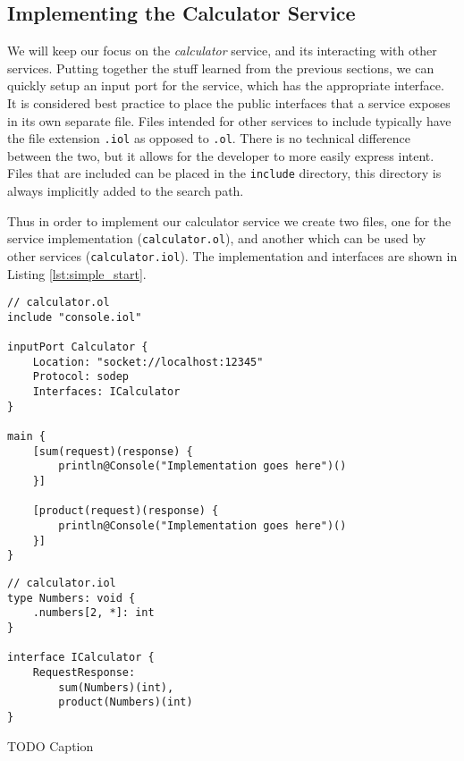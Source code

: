\subsection{Implementing the Calculator Service}

We will keep our focus on the \emph{calculator} service, and its interacting
with other services. Putting together the stuff learned from the previous
sections, we can quickly setup an input port for the service, which has the
appropriate interface. It is considered best practice to place the public
interfaces that a service exposes in its own separate file. Files intended for
other services to include typically have the file extension \verb!.iol! as
opposed to \verb!.ol!. There is no technical difference between the two, but it
allows for the developer to more easily express intent. Files that are included
can be placed in the \verb!include! directory, this directory is always
implicitly added to the search path.

Thus in order to implement our calculator service we create two files, one for
the service implementation (\verb!calculator.ol!), and another which can be
used by other services (\verb!calculator.iol!). The implementation and
interfaces are shown in Listing \ref{lst:simple_start}.

\begin{listing}[H]
\begin{multicols}{2}

\begin{verbatim}
// calculator.ol
include "console.iol"

inputPort Calculator {
    Location: "socket://localhost:12345"
    Protocol: sodep
    Interfaces: ICalculator
}

main {
    [sum(request)(response) {
        println@Console("Implementation goes here")()
    }]

    [product(request)(response) {
        println@Console("Implementation goes here")()
    }]
}
\end{verbatim}

\columnbreak

\begin{verbatim}
// calculator.iol
type Numbers: void {
    .numbers[2, *]: int
}

interface ICalculator {
    RequestResponse:
        sum(Numbers)(int),
        product(Numbers)(int)
}
\end{verbatim}
\end{multicols}
\caption{TODO Caption}
\label{lst:simple_start}
\end{listing}

